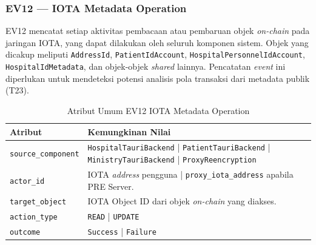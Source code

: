 \subsubsection{EV12 --- IOTA Metadata Operation}
\label{subsec:ev12-iota-metadata}

EV12 mencatat setiap aktivitas pembacaan atau pembaruan objek \textit{on-chain}
pada jaringan IOTA, yang dapat dilakukan oleh seluruh komponen sistem. Objek
yang dicakup meliputi \texttt{AddressId}, \texttt{PatientIdAccount},
\texttt{HospitalPersonnelIdAccount}, \texttt{HospitalIdMetadata}, dan
objek-objek \textit{shared} lainnya. Pencatatan \textit{event} ini diperlukan
untuk mendeteksi potensi analisis pola transaksi dari metadata publik (T23).

\begin{table}[htbp]
\centering
\caption{Atribut Umum EV12 IOTA Metadata Operation}
\label{tab:ev12-umum}
\renewcommand{\arraystretch}{1.3}
\begin{tabular}{|p{3.5cm}|p{8.5cm}|}
\hline
\textbf{Atribut} & \textbf{Kemungkinan Nilai} \\
\hline
\texttt{source\_component} &
\texttt{HospitalTauriBackend} | \texttt{PatientTauriBackend} |
\texttt{MinistryTauriBackend} | \texttt{ProxyReencryption} \\
\hline
\texttt{actor\_id} &
IOTA \textit{address} pengguna | \texttt{proxy\_iota\_address} apabila
PRE Server. \\
\hline
\texttt{target\_object} &
IOTA Object ID dari objek \textit{on-chain} yang diakses. \\
\hline
\texttt{action\_type} &
\texttt{READ} | \texttt{UPDATE} \\
\hline
\texttt{outcome} &
\texttt{Success} | \texttt{Failure} \\
\hline
\end{tabular}
\end{table}

